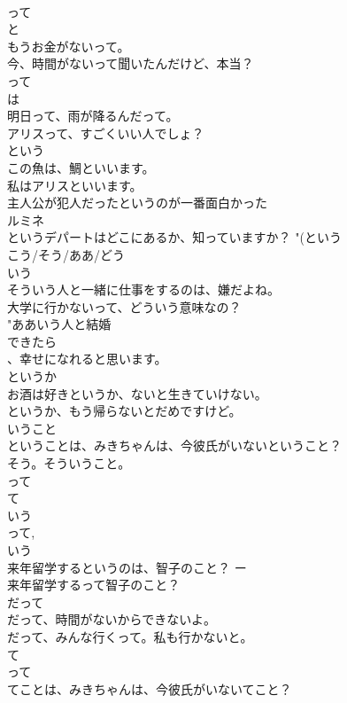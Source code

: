 \documentclass[8pt]{extreport}
\begin{document}
\begin{CJK}{UTF8}{min}
\\	って	
\\	と 
\\	もうお金がないって。 
\\	今、時間がないって聞いたんだけど、本当？ 
\\	って 
\\	は 
\\	明日って、雨が降るんだって。
\\	アリスって、すごくいい人でしょ？ 
\\	という	
\\	この魚は、鯛といいます。 
\\	私はアリスといいます。 
\\	主人公が犯人だったというのが一番面白かった  
\\	ルミネ
\\	というデパートはどこにあるか、知っていますか？	"(という 
\\	こう/そう/ああ/どう　
\\	いう	
\\	そういう人と一緒に仕事をするのは、嫌だよね。 
\\	大学に行かないって、どういう意味なの？
\\	"ああいう人と結婚
\\	できたら
\\	、幸せになれると思います。
\\	というか	
\\	お酒は好きというか、ないと生きていけない。 
\\	というか、もう帰らないとだめですけど。 
\\	いうこと	
\\	ということは、みきちゃんは、今彼氏がいないということ？ 
\\	そう。そういうこと。
\\	って 
\\	て 
\\	いう	
\\	って, 
\\	いう
\\	来年留学するというのは、智子のこと？ ー
\\	来年留学するって智子のこと？ 
\\	だって	
\\	だって、時間がないからできないよ。 
\\	だって、みんな行くって。私も行かないと。 
\\	て 
\\	って 
\\	てことは、みきちゃんは、今彼氏がいないてこと？ 

\end{CJK}
\end{document}
